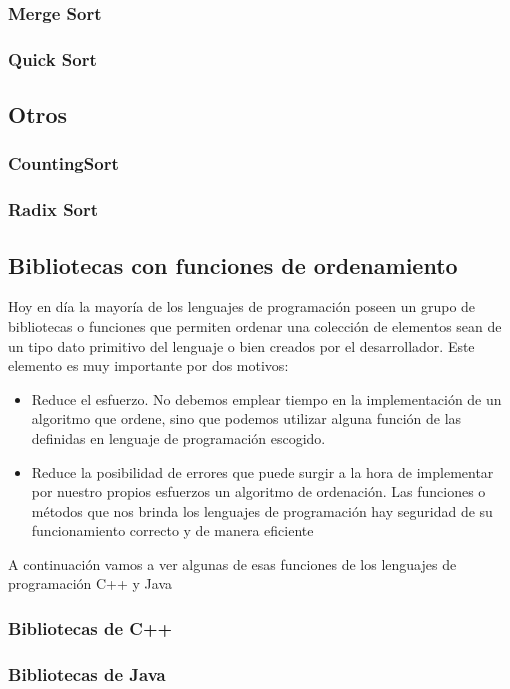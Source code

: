 \subsubsection{Merge Sort}


\subsubsection{Quick Sort}


\subsection{Otros}

\subsubsection{CountingSort}


\subsubsection{Radix Sort}





\subsection{Bibliotecas con funciones de ordenamiento}
Hoy en día la mayoría de los lenguajes de programación poseen un grupo de bibliotecas o funciones que permiten ordenar una colección de elementos sean de un tipo dato primitivo del lenguaje o bien creados por el desarrollador. Este elemento es muy importante por dos motivos:
\begin{itemize}
	\item Reduce el esfuerzo. No debemos emplear tiempo en la implementación de un algoritmo que ordene, sino que podemos utilizar alguna función de las definidas en lenguaje de programación escogido.
	\item Reduce la posibilidad de errores que puede surgir a la hora de implementar por nuestro propios esfuerzos un algoritmo de ordenación. Las funciones o métodos que nos brinda los lenguajes de programación hay seguridad de su funcionamiento correcto y de manera eficiente 
\end{itemize}

A continuación vamos a ver algunas de esas funciones de los lenguajes de programación C++ y Java

\subsubsection{Bibliotecas de C++}


\subsubsection{Bibliotecas de Java}
